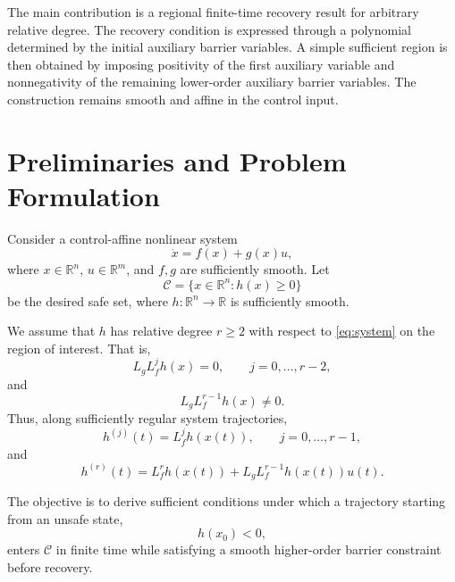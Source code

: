 \documentclass[11pt]{article}
\newcommand{\R}{\mathbb{R}}
\newcommand{\safeSet}{\mathcal{C}}
\begin{document}
The main contribution is a regional finite-time recovery result for arbitrary relative degree. The recovery condition is expressed through a polynomial determined by the initial auxiliary barrier variables. A simple sufficient region is then obtained by imposing positivity of the first auxiliary variable and nonnegativity of the remaining lower-order auxiliary barrier variables. The construction remains smooth and affine in the control input.

\section{Preliminaries and Problem Formulation}

Consider a control-affine nonlinear system
\begin{equation}
\dot x = f(x)+g(x)u,
\label{eq:system}
\end{equation}
where $x\in\R^n$, $u\in\R^m$, and $f,g$ are sufficiently smooth. Let
\begin{equation}
\safeSet = \{x\in\R^n : h(x)\ge0\}
\label{eq:safe-set}
\end{equation}
be the desired safe set, where $h:\R^n\to\R$ is sufficiently smooth.

We assume that $h$ has relative degree $r\ge2$ with respect to \eqref{eq:system} on the region of interest. That is,
\begin{equation}
L_gL_f^j h(x)=0,
\qquad j=0,\dots,r-2,
\label{eq:relative-degree-zero}
\end{equation}
and
\begin{equation}
L_gL_f^{r-1}h(x)\neq0.
\label{eq:relative-degree-nonzero}
\end{equation}
Thus, along sufficiently regular system trajectories,
\begin{equation}
h^{(j)}(t)=L_f^j h(x(t)),
\qquad j=0,\dots,r-1,
\end{equation}
and
\begin{equation}
h^{(r)}(t)
=
L_f^r h(x(t))
+
L_gL_f^{r-1}h(x(t))u(t).
\end{equation}

The objective is to derive sufficient conditions under which a trajectory starting from an unsafe state,
\begin{equation}
h(x_0)<0,
\label{eq:unsafe-initial-state}
\end{equation}
enters $\safeSet$ in finite time while satisfying a smooth higher-order barrier constraint before recovery.
\end{document}
